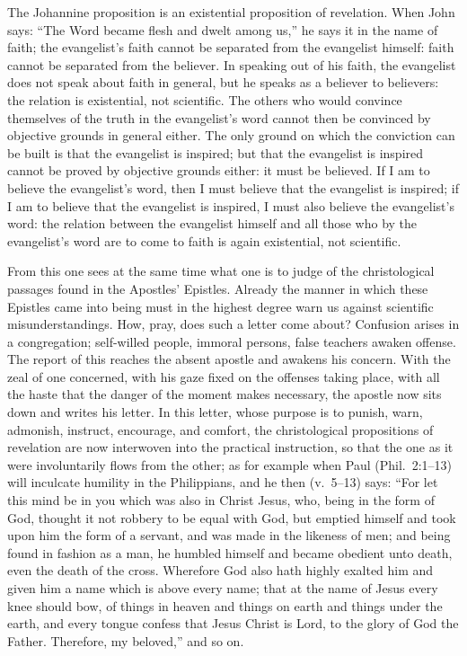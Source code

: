 \documentclass[12pt,a4paper]{book}
\begin{document}
The Johannine proposition is an existential proposition of revelation. When John says: ``The
Word became flesh and dwelt among us,'' he says it in the name of faith; the evangelist's faith
cannot be separated from the evangelist himself: faith cannot be separated from the believer.
In speaking out of his faith, the evangelist does not speak about faith in general, but he
speaks as a believer to believers: the relation is existential, not scientific. The others who
would convince themselves of the truth in the evangelist's word cannot then be convinced by
objective grounds in general either. The only ground on which the conviction can be built is
that the evangelist is inspired; but that the evangelist is inspired cannot be proved by
objective grounds either: it must be believed. If I am to believe the evangelist's word, then I
must believe that the evangelist is inspired; if I am to believe that the evangelist is
inspired, I must also believe the evangelist's word: the relation between the evangelist himself
and all those who by the evangelist's word are to come to faith is again existential, not
scientific.

From this one sees at the same time what one is to judge of the christological passages found
in the Apostles' Epistles. Already the manner in which these Epistles came into being must in
the highest degree warn us against scientific misunderstandings. How, pray, does such a letter
come about? Confusion arises in a congregation; self-willed people, immoral persons, false
teachers awaken offense. The report of this reaches the absent apostle and awakens his concern.
With the zeal of one concerned, with his gaze fixed on the offenses taking place, with all the
haste that the danger of the moment makes necessary, the apostle now sits down and writes his
letter. In this letter, whose purpose is to punish, warn, admonish, instruct, encourage, and
comfort, the christological propositions of revelation are now interwoven into the practical
instruction, so that the one as it were involuntarily flows from the other; as for example when
Paul (Phil.\ 2:1--13) will inculcate humility in the Philippians, and he then (v.\ 5--13) says:
``For let this mind be in you which was also in Christ Jesus, who, being in the form of God,
thought it not robbery to be equal with God, but emptied himself and took upon him the form of
a servant, and was made in the likeness of men; and being found in fashion as a man, he humbled
himself and became obedient unto death, even the death of the cross. Wherefore God also hath
highly exalted him and given him a name which is above every name; that at the name of Jesus
every knee should bow, of things in heaven and things on earth and things under the earth, and
every tongue confess that Jesus Christ is Lord, to the glory of God the Father. Therefore, my
beloved,'' and so on.
\end{document}
